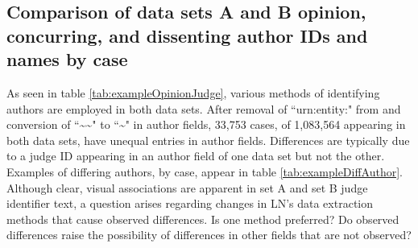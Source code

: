 \documentclass[10pt, letterpaper]{article}
\begin{document}
\begin{spacing}{1.0}

\clearpage

\subsection{Comparison of data sets A and B opinion, concurring, and dissenting author IDs and names by case}

As seen in table \ref{tab:exampleOpinionJudge}, various methods of identifying authors are employed in both data sets.  After removal of ``urn:entity:" from and conversion of ``\textasciitilde\textasciitilde" to ``\textasciitilde" in author fields, 33,753 cases, of 1,083,564 appearing in both data sets, have unequal entries in author fields.  Differences are typically due to a judge ID appearing in an author field of one data set but not the other.  Examples of differing authors, by case, appear in table \ref{tab:exampleDiffAuthor}.  Although clear, visual associations are apparent in set A and set B judge identifier text, a question arises regarding changes in LN's data extraction methods that cause observed differences.  Is one method preferred?  Do observed differences raise the possibility of differences in other fields that are not observed?

\vspace{0.25in}


\end{spacing}
\end{document}
